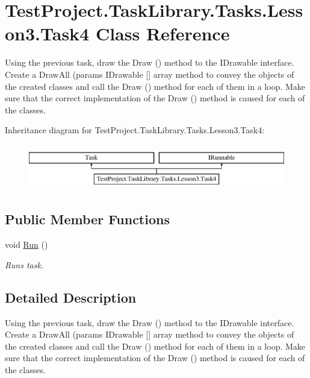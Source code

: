 \hypertarget{class_test_project_1_1_task_library_1_1_tasks_1_1_lesson3_1_1_task4}{}\section{Test\+Project.\+Task\+Library.\+Tasks.\+Lesson3.\+Task4 Class Reference}
\label{class_test_project_1_1_task_library_1_1_tasks_1_1_lesson3_1_1_task4}


Using the previous task, draw the Draw () method to the I\+Drawable interface. Create a Draw\+All (params I\+Drawable \mbox{[}\mbox{]} array method to convey the objects of the created classes and call the Draw () method for each of them in a loop. Make sure that the correct implementation of the Draw () method is caused for each of the classes.  


Inheritance diagram for Test\+Project.\+Task\+Library.\+Tasks.\+Lesson3.\+Task4\+:\begin{figure}[H]
\begin{center}
\leavevmode
\includegraphics[height=2.000000cm]{class_test_project_1_1_task_library_1_1_tasks_1_1_lesson3_1_1_task4}
\end{center}
\end{figure}
\subsection*{Public Member Functions}
\begin{DoxyCompactItemize}
\item 
void \mbox{\hyperlink{class_test_project_1_1_task_library_1_1_tasks_1_1_lesson3_1_1_task4_a7b8ee0f442413f8579a30483c4b1d6d9}{Run}} ()
\begin{DoxyCompactList}\small\item\em Runs task. \end{DoxyCompactList}\end{DoxyCompactItemize}


\subsection{Detailed Description}
Using the previous task, draw the Draw () method to the I\+Drawable interface. Create a Draw\+All (params I\+Drawable \mbox{[}\mbox{]} array method to convey the objects of the created classes and call the Draw () method for each of them in a loop. Make sure that the correct implementation of the Draw () method is caused for each of the classes. 



